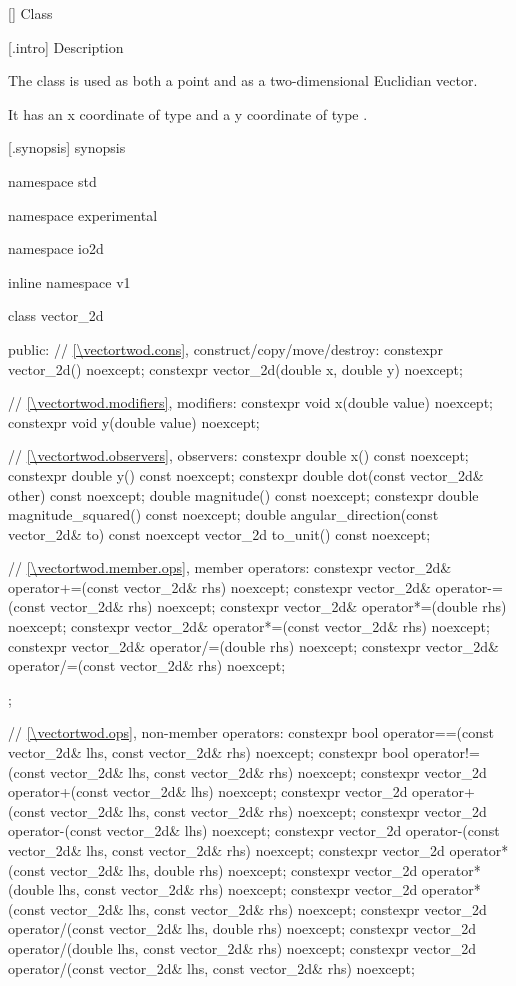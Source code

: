  [\vectortwod] {Class }

 [\vectortwod.intro] { Description}

\pnum
The class  is used as both a point and as a two-dimensional Euclidian vector.

\pnum
It has an x coordinate of type  and a y coordinate of type .

 [\vectortwod.synopsis] { synopsis}

\begin{codeblock}
namespace std { namespace experimental { namespace io2d { inline namespace v1 {
  class vector_2d {
  public:
    // \ref{\vectortwod.cons}, construct/copy/move/destroy:
    constexpr vector_2d() noexcept;
    constexpr vector_2d(double x, double y) noexcept;

    // \ref{\vectortwod.modifiers}, modifiers:
    constexpr void x(double value) noexcept;
    constexpr void y(double value) noexcept;
    
    // \ref{\vectortwod.observers}, observers:
    constexpr double x() const noexcept;
    constexpr double y() const noexcept;
    constexpr double dot(const vector_2d& other) const noexcept;
    double magnitude() const noexcept;
    constexpr double magnitude_squared() const noexcept;
    double angular_direction(const vector_2d& to) const noexcept
    vector_2d to_unit() const noexcept;
    
    // \ref{\vectortwod.member.ops}, member operators:
    constexpr vector_2d& operator+=(const vector_2d& rhs) noexcept;
    constexpr vector_2d& operator-=(const vector_2d& rhs) noexcept;
    constexpr vector_2d& operator*=(double rhs) noexcept;
    constexpr vector_2d& operator*=(const vector_2d& rhs) noexcept;
    constexpr vector_2d& operator/=(double rhs) noexcept;
    constexpr vector_2d& operator/=(const vector_2d& rhs) noexcept;
  };
  
  // \ref{\vectortwod.ops}, non-member operators:
  constexpr bool operator==(const vector_2d& lhs, const vector_2d& rhs)
    noexcept;
  constexpr bool operator!=(const vector_2d& lhs, const vector_2d& rhs)
    noexcept;
  constexpr vector_2d operator+(const vector_2d& lhs) noexcept;
  constexpr vector_2d operator+(const vector_2d& lhs, const vector_2d& rhs)
    noexcept;
  constexpr vector_2d operator-(const vector_2d& lhs) noexcept;
  constexpr vector_2d operator-(const vector_2d& lhs, const vector_2d& rhs)
    noexcept;
  constexpr vector_2d operator*(const vector_2d& lhs, double rhs) noexcept;
  constexpr vector_2d operator*(double lhs, const vector_2d& rhs) noexcept;
  constexpr vector_2d operator*(const vector_2d& lhs, const vector_2d& rhs)
    noexcept;
  constexpr vector_2d operator/(const vector_2d& lhs, double rhs) noexcept;
  constexpr vector_2d operator/(double lhs, const vector_2d& rhs) noexcept;
  constexpr vector_2d operator/(const vector_2d& lhs, const vector_2d& rhs)
    noexcept;
} } } }
\end{codeblock}

